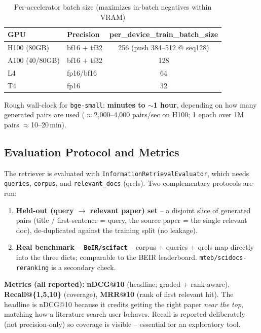 \documentclass[12pt,a4paper]{article}
\begin{document}
\begin{table}[H]
\centering
\caption{Per-accelerator batch size (maximizes in-batch negatives within VRAM)}
\begin{tabular}{llc}
\toprule
\textbf{GPU} & \textbf{Precision} & \textbf{per\_device\_train\_batch\_size} \\
\midrule
H100 (80GB) & bf16 + tf32 & 256 (push 384--512 @ seq128) \\
A100 (40/80GB) & bf16 + tf32 & 128 \\
L4 & fp16/bf16 & 64 \\
T4 & fp16 & 32 \\
\bottomrule
\end{tabular}
\end{table}

Rough wall-clock for \texttt{bge-small}: \textbf{minutes to $\sim$1 hour}, depending on how many generated pairs are used ($\approx$2{,}000--4{,}000 pairs/sec on H100; 1 epoch over 1M pairs $\approx$10--20\,min).

\subsection{Evaluation Protocol and Metrics}

The retriever is evaluated with \texttt{InformationRetrievalEvaluator}, which needs \texttt{queries}, \texttt{corpus}, and \texttt{relevant\_docs} (qrels). Two complementary protocols are run:
\begin{enumerate}
  \item \textbf{Held-out (query $\rightarrow$ relevant paper) set} -- a disjoint slice of generated pairs (title / first-sentence = query, the source paper = the single relevant doc), de-duplicated against the training split (no leakage).
  \item \textbf{Real benchmark -- \texttt{BeIR/scifact}} -- corpus + queries + qrels map directly into the three dicts; comparable to the BEIR leaderboard. \texttt{mteb/scidocs-reranking} is a secondary check.
\end{enumerate}

\textbf{Metrics (all reported):} \textbf{nDCG@10} (headline; graded + rank-aware), \textbf{Recall@\{1,5,10\}} (coverage), \textbf{MRR@10} (rank of first relevant hit). The headline is nDCG@10 because it credits getting the right paper \emph{near the top}, matching how a literature-search user behaves. Recall is reported deliberately (not precision-only) so coverage is visible -- essential for an exploratory tool.
\end{document}
